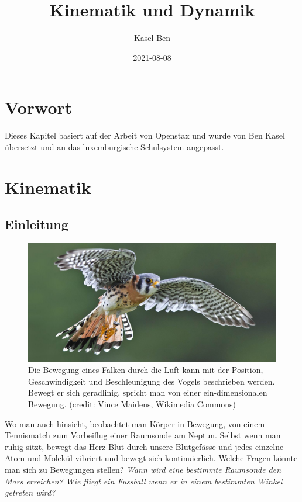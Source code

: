\documentclass[
]{book}
\title{Kinematik und Dynamik}
\author{Kasel Ben}
\date{2021-08-08}
\begin{document}
\maketitle

{
\setcounter{tocdepth}{1}
\tableofcontents
}
\hypertarget{vorwort}{%
\chapter{Vorwort}\label{vorwort}}

Dieses Kapitel basiert auf der Arbeit von Openstax \citet{wolfe_college_2015} und wurde von Ben Kasel übersetzt und an das luxemburgische Schulsystem angepasst.

\hypertarget{kinematik}{%
\chapter{Kinematik}\label{kinematik}}

\hypertarget{einleitung}{%
\section{Einleitung}\label{einleitung}}

\begin{figure}
\hypertarget{import-auto-id2758213}{%
\centering
\includegraphics{images/Figure_02_00_01_D.jpg}
\caption{Die Bewegung eines Falken durch die Luft kann mit der Position, Geschwindigkeit und Beschleunigung des Vogels beschrieben werden. Bewegt er sich geradlinig, spricht man von einer ein-dimensionalen Bewegung. (credit: Vince Maidens, Wikimedia
Commons)}\label{import-auto-id2758213}
}
\end{figure}

Wo man auch hinsieht, beobachtet man Körper in Bewegung, von einem Tennismatch zum Vorbeiflug einer Raumsonde am Neptun. Selbst wenn man ruhig sitzt, bewegt das Herz Blut durch unsere Blutgefässe und jedes einzelne Atom und Molekül vibriert und bewegt sich kontinuierlich. Welche Fragen könnte man sich zu Bewegungen stellen? \emph{Wann wird eine bestimmte Raumsonde den Mars erreichen? Wie fliegt ein Fussball wenn er in einem bestimmten Winkel getreten wird?}
\end{document}
